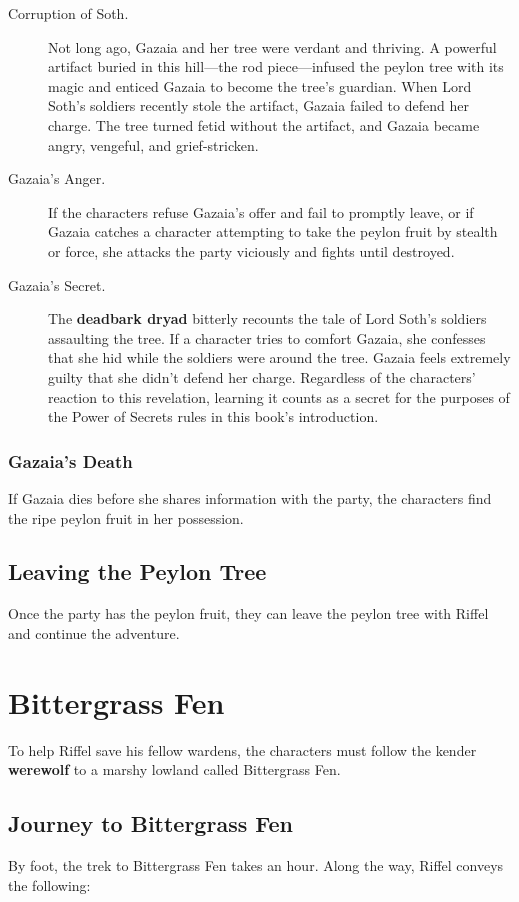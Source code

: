 \documentclass[10pt,a4paper,twoside,bg=print,twocolumn,openany,nodeprecatedcode]{dndbook}
\begin{document}
\begin{description}
\item[Corruption of Soth.]
Not long ago, Gazaia and her tree were verdant and thriving. A powerful artifact buried in this hill—the rod piece—infused the peylon tree with its magic and enticed Gazaia to become the tree's guardian. When Lord Soth's soldiers recently stole the artifact, Gazaia failed to defend her charge. The tree turned fetid without the artifact, and Gazaia became angry, vengeful, and grief-stricken.
\item[Gazaia's Anger.]
If the characters refuse Gazaia's offer and fail to promptly leave, or if Gazaia catches a character attempting to take the peylon fruit by stealth or force, she attacks the party viciously and fights until destroyed.
\item[Gazaia's Secret.]
The \textbf{deadbark dryad} bitterly recounts the tale of Lord Soth's soldiers assaulting the tree. If a character tries to comfort Gazaia, she confesses that she hid while the soldiers were around the tree. Gazaia feels extremely guilty that she didn't defend her charge. Regardless of the characters' reaction to this revelation, learning it counts as a secret for the purposes of the Power of Secrets rules in this book's introduction.
\end{description}

\subsubsection{Gazaia's Death}
If Gazaia dies before she shares information with the party, the characters find the ripe peylon fruit in her possession.

\subsection{Leaving the Peylon Tree}
Once the party has the peylon fruit, they can leave the peylon tree with Riffel and continue the adventure.

\section{Bittergrass Fen}
To help Riffel save his fellow wardens, the characters must follow the kender \textbf{werewolf} to a marshy lowland called Bittergrass Fen.

\subsection{Journey to Bittergrass Fen}
By foot, the trek to Bittergrass Fen takes an hour. Along the way, Riffel conveys the following:
\end{document}
